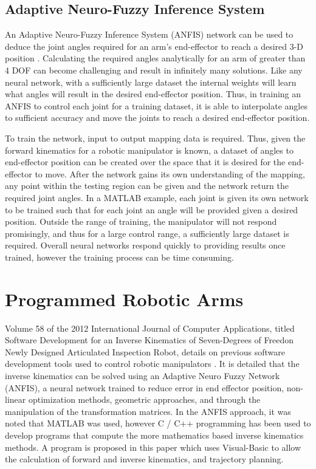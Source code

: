 \documentclass[12pt,openany,a4paper]{book}
\begin{document}
\subsection{Adaptive Neuro-Fuzzy Inference System}
An Adaptive Neuro-Fuzzy Inference System (ANFIS) network can be used to deduce the joint angles required for an arm's end-effector to reach a desired 3-D position \cite{MatlabIK}. Calculating the required angles analytically for an arm of greater than 4 DOF can become challenging and result in infinitely many solutions. Like any neural network, with a sufficiently large dataset the internal weights will learn what angles will result in the desired end-effector position. Thus, in training an ANFIS to control each joint for a training dataset, it is able to interpolate angles to sufficient accuracy and move the joints to reach a desired end-effector position.

To train the network, input to output mapping data is required. Thus, given the forward kinematics for a robotic manipulator is known, a dataset of angles to end-effector position can be created over the space that it is desired for the end-effector to move. After the network gains its own understanding of the mapping, any point within the testing region can be given and the network return the required joint angles. In a MATLAB example, each joint is given its own network to be trained such that for each joint an angle will be provided given a desired position. Outside the range of training, the manipulator will not respond promisingly, and thus for a large control range, a sufficiently large dataset is required. Overall neural networks respond quickly to providing results once trained, however the training process can be time consuming.

\section{Programmed Robotic Arms}
Volume 58 of the 2012 International Journal of Computer Applications, titled Software Development for an Inverse Kinematics of Seven-Degrees of Freedon Newly Designed Articulated Inspection Robot, details on previous software development tools used to control robotic manipulators \cite{software-IK7DOF}. It is detailed that the inverse kinematics can be solved using an Adaptive Neuro Fuzzy Network (ANFIS), a neural network trained to reduce error in end effector position, non-linear optimization methods, geometric approaches, and through the manipulation of the transformation matrices. In the ANFIS approach, it was noted that MATLAB was used, however C / C++ programming has been used to develop programs that compute the more mathematics based inverse kinematics methods. A program is proposed in this paper which uses Visual-Basic to allow the calculation of forward and inverse kinematics, and trajectory planning.\\
\end{document}
